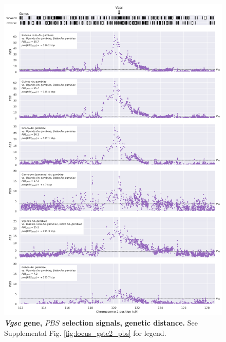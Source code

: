 \documentclass[a4paper,11pt,abstracton,hidelinks]{scrartcl}
\begin{document}
\begin{figure}[t!]
	\begin{center}
		\includegraphics*[width=1\linewidth,center]{artwork/locus_vgsc_pbs_gdist.png}
	\end{center}
	\caption[\textit{Vgsc} gene, $PBS$ selection signals, genetic distance]{
	\textbf{\textit{Vgsc} gene, $PBS$ selection signals, genetic distance.}
	See Supplemental Fig. \ref{fig:locus_gste2_pbs} for legend.
	} 
	\label{fig:locus_vgsc_pbs_gdist}
\end{figure}


\clearpage
\end{document}
